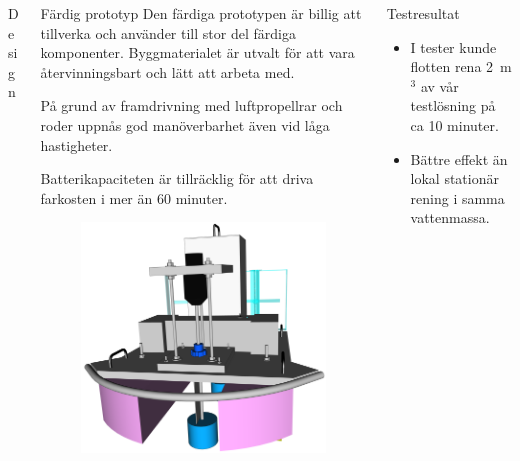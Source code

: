 \documentclass[final]{beamer}
\newlength{\onecolwid}
\begin{document}
\begin{frame}[t]
\begin{columns}[t, totalwidth=\textwidth]
\begin{column}{\onecolwid}
\begin{block}{Design}
      \end{block}

    \end{column}
    \begin{column}{\onecolwid}

      \begin{block}{Färdig prototyp}
        Den färdiga prototypen är billig att tillverka och använder till stor del
        färdiga komponenter. Byggmaterialet är utvalt för att vara återvinningsbart
        och lätt att arbeta med.

        På grund av framdrivning med luftpropellrar och roder uppnås god manöverbarhet
        även vid låga hastigheter.

        Batterikapaciteten är tillräcklig för att driva farkosten i mer än 60 minuter.

        \vskip 2cm
        \begin{figure}[H]
          \centering
          \hbox{\hspace{-3cm}\includegraphics[width=25cm]{figures/front_rbr.png}}
        \end{figure}
      \end{block}

    \end{column}
    \begin{column}{\onecolwid}

      \begin{block}{Testresultat}
        \begin{itemize}
        \item I tester kunde flotten rena 2~m$^3$ av vår testlösning på ca 10 minuter.
        \item Bättre effekt än lokal stationär rening i samma vattenmassa.
        \end{itemize}


\end{block}
\end{column}
\end{columns}
\end{frame}
\end{document}
